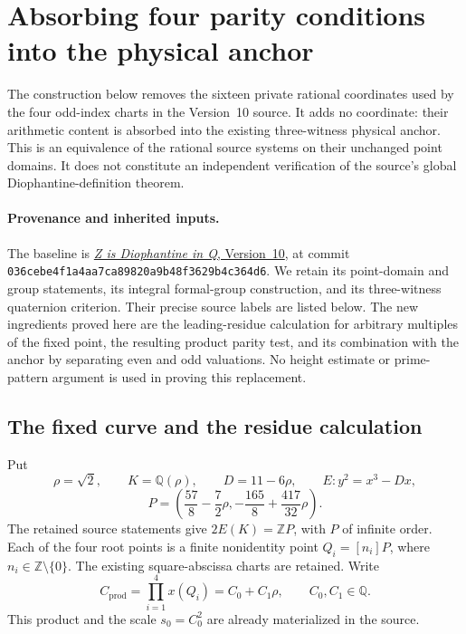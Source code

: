 \section{Absorbing four parity conditions into the physical anchor}
\label{sec:packed-anchor-note}

The construction below removes the sixteen private rational coordinates
used by the four odd-index charts in the Version~10 source.  It adds no
coordinate: their arithmetic content is absorbed into the existing
three-witness physical anchor.  This is an equivalence of the rational
source systems on their unchanged point domains.  It does not constitute
an independent verification of the source's global Diophantine-definition
theorem.

\paragraph{Provenance and inherited inputs.}
The baseline is
\href{https://github.com/elliotglazer/diophantine-z-q/blob/036cebe4f1a4aa7ca89820a9b48f3629b4c364d6/manuscripts/quartic_v10.tex}{\emph{Z is Diophantine in Q}, Version~10},
at commit
\texttt{036cebe4f1a4aa7ca89820a9b48f3629b4c364d6}.
We retain its point-domain and group statements, its integral formal-group
construction, and its three-witness quaternion criterion.  Their precise
source labels are listed below.  The new ingredients proved here are the
leading-residue calculation for arbitrary multiples of the fixed point,
the resulting product parity test, and its combination with the anchor by
separating even and odd valuations.  No height estimate or prime-pattern
argument is used in proving this replacement.

\subsection{The fixed curve and the residue calculation}

Put
\[
 \rho=\sqrt2,\qquad K=\mathbb Q(\rho),\qquad
 D=11-6\rho,\qquad E:y^2=x^3-Dx,
\]
\[
 P=\left(\frac{57}{8}-\frac72\rho,
          -\frac{165}{8}+\frac{417}{32}\rho\right).
\]
The retained source statements give $2E(K)=\mathbb ZP$, with $P$ of
infinite order.  Each of the four root points is a finite nonidentity
point $Q_i=[n_i]P$, where $n_i\in\mathbb Z\setminus\{0\}$.  The existing
square-abscissa charts are retained.  Write
\[
 C_{\mathrm{prod}}=\prod_{i=1}^4x(Q_i)=C_0+C_1\rho,
 \qquad C_0,C_1\in\mathbb Q.
\]
This product and the scale $s_0=C_0^2$ are already materialized in the
source.

